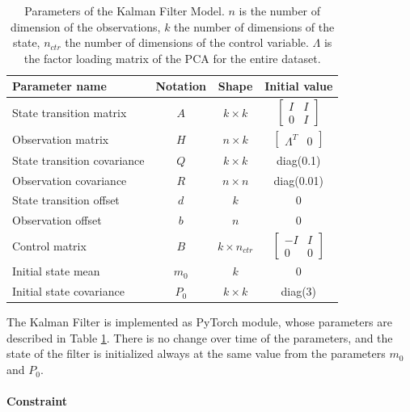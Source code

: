 \documentclass{article}
\begin{document}
\begin{table}
\caption{Parameters of the Kalman Filter Model. $n$ is the number of dimension of the observations, $k$ the number of dimensions of the state, $n_{ctr}$ the number of dimensions of the control variable. $\Lambda$ is the factor loading matrix of the PCA for the entire dataset.}
\label{table:parameters}
\vspace{5pt}
\centering
\begin{tabular}{l c c c}
\toprule
    \bfseries Parameter name & \bfseries Notation & \bfseries Shape & \bfseries Initial value\\
    \hline
    \noalign{\vspace{4pt}}
    State transition matrix & $A$ & $k \times k$ & $\begin{bmatrix}I & I \\ 0 & I\end{bmatrix}$ \\
    \noalign{\vspace{4pt}}
    Observation matrix & $H$ & $n \times k$ & $\begin{bmatrix}\Lambda^T & 0 \end{bmatrix}$ \\
    State transition covariance & $Q$ & $k \times k$ & diag(0.1) \\
    Observation covariance & $R$ & $n \times n$ & diag(0.01)\\
    State transition offset & $d$ & $k$ & 0 \\
    Observation offset & $b$ & $n$ & 0 \\
    Control matrix & $B$ & $k \times n_{ctr}$ & $\begin{bmatrix} -I & I \\ 0 & 0 \end{bmatrix}$ \\
    Initial state mean & $m_0$ & $k$ & $0$ \\
    Initial state covariance & $P_0$ & $k \times k$ & diag(3) \\
\bottomrule
\end{tabular}
\end{table}

The Kalman Filter is implemented as PyTorch module, whose parameters are described in Table \ref{table:parameters}.
There is no change over time of the parameters, and the state of the filter is initialized always at the same value from the parameters $m_0$ and $P_0$.

\paragraph{Constraint}
\end{document}
